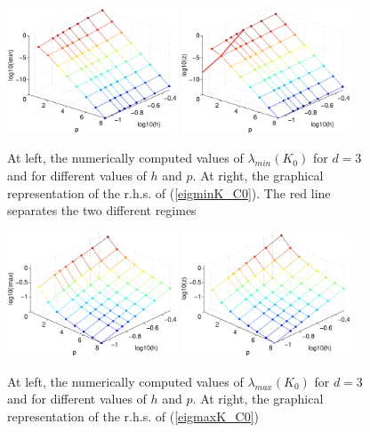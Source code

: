 \documentclass[11pt]{article}
\begin{document}
\begin{figure}
\begin{center}
\includegraphics[width=0.45\textwidth]{Images/iga0_eigK3min.eps}\quad
\includegraphics[width=0.45\textwidth]{Images/iga0_eigK3smin.eps}
\end{center}
\caption{At left, the numerically computed values of
$\lambda_{min}(K_0)$ for $d=3$ and
for different values of $h$ and $p$. At right,
the graphical representation of the r.h.s. of (\ref{eigminK_C0}). The red line
separates the two different regimes}
\label{fig:stiffmin-iga0d3}
\end{figure}

\begin{figure}
\begin{center}
\includegraphics[width=0.45\textwidth]{Images/iga0_eigK3max.eps}\quad
\includegraphics[width=0.45\textwidth]{Images/iga0_eigK3smax.eps}
\end{center}
\caption{At left, the numerically computed values of
$\lambda_{max}(K_0)$ for $d=3$ and
for different values of $h$ and $p$. At right,
the graphical representation of the r.h.s. of (\ref{eigmaxK_C0})}
\label{fig:stiffmax-iga0d3}
\end{figure}
\end{document}
